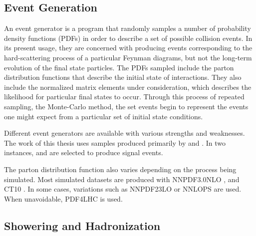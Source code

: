\subsection{Event Generation} \label{sec:evtGen}

An event generator is a program that randomly samples a number of probability density functions (PDFs) in order to describe a set of possible collision events.
In its present usage, they are concerned with producing events corresponding to the hard-scattering process of a particular Feynman diagrams, but not the long-term evolution of the final state particles.
The PDFs sampled include the parton distribution functions that describe the initial state of interactions.
They also include the normalized matrix elements under consideration, which describes the likelihood for particular final states to occur.
Through this process of repeated sampling, the Monte-Carlo method, the set events begin to represent the events one might expect from a particular set of initial state conditions.

Different event generators are available with various strengths and weaknesses.
The work of this thesis uses samples produced primarily by \sherpa \cite{Gleisberg:2008ta} and \powheg \cite{Alioli:2010xd,Frixione:2007vw}.
In two instances, \pythia \cite{pythia8} and \madgraph \cite{Alwall:2014hca} are selected to produce signal events.

The parton distribution function also varies depending on the process being simulated.
Most simulated datasets are produced with NNPDF3.0NLO \cite{Ball:2014uwa}, and CT10 \cite{ct10}.
In some cases, variations such as NNPDF23LO \cite{Ball:2012cx} or NNLOPS \cite{Hamilton:2013fea} are used.
When unavoidable, PDF4LHC \cite{Butterworth:2015oua} is used.




\subsection{Showering and Hadronization} \label{sec:hadronization}

